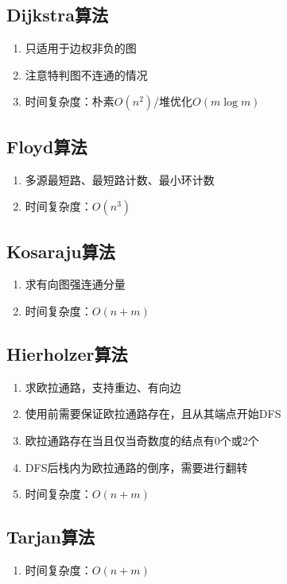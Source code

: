 \documentclass[twocolumn,a4,8pt]{article}  %
\begin{document}
		\subsection{Dijkstra算法}
			\noindent\begin{enumerate}
				\item 只适用于边权非负的图
				\item 注意特判图不连通的情况
				\item 时间复杂度：朴素$O(n^2)$/堆优化$O(m\log m)$
			\end{enumerate}
	 	 	
	 	 	
		\subsection{Floyd算法}
			\noindent\begin{enumerate}
				\item 多源最短路、最短路计数、最小环计数
				\item 时间复杂度：$O(n^3)$
			\end{enumerate}
	 	 	
	 	 	
		\subsection{Kosaraju算法}
			\noindent\begin{enumerate}
				\item 求有向图强连通分量
				\item 时间复杂度：$O(n+m)$
			\end{enumerate}
	 	 	
	 	 	
		\subsection{Hierholzer算法}
			\noindent\begin{enumerate}
				\item 求欧拉通路，支持重边、有向边
				\item 使用前需要保证欧拉通路存在，且从其端点开始DFS
				\item 欧拉通路存在当且仅当奇数度的结点有$0$个或$2$个
				\item DFS后栈内为欧拉通路的倒序，需要进行翻转
				\item 时间复杂度：$O(n+m)$
			\end{enumerate}
	 	 	
	 	 	
	 	\subsection{Tarjan算法}
			\noindent\begin{enumerate}
				\item 时间复杂度：$O(n+m)$
			\end{enumerate}
	 	 	
	 	 	
\end{document}

